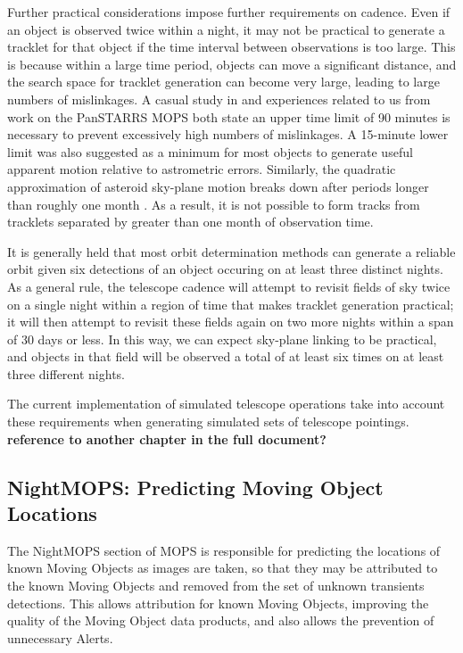\documentclass[12pt,preprint]{aastex}
\begin{document}
Further practical considerations impose further requirements on
cadence. Even if an object is observed twice within a night, it may
not be practical to generate a tracklet for that object if the time
interval between observations is too large.  This is because within a
large time period, objects can move a significant distance, and the
search space for tracklet generation can become very large, leading to
large numbers of mislinkages.  A casual study in \citet{kubica_thesis}
and experiences related to us from work on the PanSTARRS MOPS both
state an upper time limit of 90 minutes is necessary to prevent
excessively high numbers of mislinkages. A 15-minute lower limit was
also suggested as a minimum for most objects to generate useful
apparent motion relative to astrometric errors. Similarly, the
quadratic approximation of asteroid sky-plane motion breaks down after
periods longer than roughly one month \citep{kubica_thesis}.  As a
result, it is not possible to form tracks from tracklets separated by
greater than one month of observation time.

It is generally held that most orbit determination methods can
generate a reliable orbit given six detections of an object occuring
on at least three distinct nights.  As a general rule, the telescope
cadence will attempt to revisit fields of sky twice on a single night
within a region of time that makes tracklet generation practical; it
will then attempt to revisit these fields again on two more nights
within a span of 30 days or less.  In this way, we can expect
sky-plane linking to be practical, and objects in that field will be
observed a total of at least six times on at least three different
nights.


The current implementation of simulated telescope operations
take into account these requirements when generating simulated sets of
telescope pointings. \textbf{reference to another chapter in the full
  document?}


\subsection{NightMOPS: Predicting Moving Object Locations}

The NightMOPS section of MOPS is responsible for predicting the
locations of known Moving Objects as images are taken, so that they
may be attributed to the known Moving Objects and removed from the set
of unknown transients detections.  This allows attribution for known
Moving Objects, improving the quality of the Moving Object data
products, and also allows the prevention of unnecessary Alerts.
\end{document}
